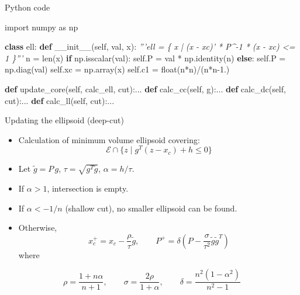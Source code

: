 \documentclass[10pt,ignorenonframetext,serif,onlymath]{beamer}
\newenvironment{Shaded}{}{}
\newcommand{\BuiltInTok}[1]{#1}
\newcommand{\CommentTok}[1]{\textcolor[rgb]{0.38,0.63,0.69}{\textit{#1}}}
\newcommand{\ControlFlowTok}[1]{\textcolor[rgb]{0.00,0.44,0.13}{\textbf{#1}}}
\newcommand{\FloatTok}[1]{\textcolor[rgb]{0.25,0.63,0.44}{#1}}
\newcommand{\FunctionTok}[1]{\textcolor[rgb]{0.02,0.16,0.49}{#1}}
\newcommand{\ImportTok}[1]{#1}
\newcommand{\KeywordTok}[1]{\textcolor[rgb]{0.00,0.44,0.13}{\textbf{#1}}}
\newcommand{\NormalTok}[1]{#1}
\newcommand{\OperatorTok}[1]{\textcolor[rgb]{0.40,0.40,0.40}{#1}}
\newcommand{\VariableTok}[1]{\textcolor[rgb]{0.10,0.09,0.49}{#1}}
\providecommand{\tightlist}{%
  \setlength{\itemsep}{0pt}\setlength{\parskip}{0pt}}
\begin{document}
\begin{frame}[fragile]{Python code}
\protect\hypertarget{sec:python-code-3}{}

\begin{Shaded}
\begin{Highlighting}[]
\ImportTok{import}\NormalTok{ numpy }\ImportTok{as}\NormalTok{ np}

\KeywordTok{class}\NormalTok{ ell:}
    \KeywordTok{def} \FunctionTok{__init__}\NormalTok{(}\VariableTok{self}\NormalTok{, val, x):}
        \CommentTok{'''ell = \{ x | (x - xc)' * P^-1 * (x - xc) <= 1 \}'''}
\NormalTok{        n }\OperatorTok{=} \BuiltInTok{len}\NormalTok{(x)}
        \ControlFlowTok{if}\NormalTok{ np.isscalar(val):}
            \VariableTok{self}\NormalTok{.P }\OperatorTok{=}\NormalTok{ val }\OperatorTok{*}\NormalTok{ np.identity(n)}
        \ControlFlowTok{else}\NormalTok{:}
            \VariableTok{self}\NormalTok{.P }\OperatorTok{=}\NormalTok{ np.diag(val)}
        \VariableTok{self}\NormalTok{.xc }\OperatorTok{=}\NormalTok{ np.array(x)}
        \VariableTok{self}\NormalTok{.c1 }\OperatorTok{=} \BuiltInTok{float}\NormalTok{(n}\OperatorTok{*}\NormalTok{n)}\OperatorTok{/}\NormalTok{(n}\OperatorTok{*}\NormalTok{n}\FloatTok{-1.}\NormalTok{)}

    \KeywordTok{def}\NormalTok{ update_core(}\VariableTok{self}\NormalTok{, calc_ell, cut):...}
    \KeywordTok{def}\NormalTok{ calc_cc(}\VariableTok{self}\NormalTok{, g):...}
    \KeywordTok{def}\NormalTok{ calc_dc(}\VariableTok{self}\NormalTok{, cut):...}
    \KeywordTok{def}\NormalTok{ calc_ll(}\VariableTok{self}\NormalTok{, cut):...}
\end{Highlighting}
\end{Shaded}

\end{frame}

\begin{frame}{Updating the ellipsoid (deep-cut)}
\protect\hypertarget{sec:updating-the-ellipsoid-deep-cut}{}

\begin{itemize}
\tightlist
\item
  Calculation of minimum volume ellipsoid covering:
  \[\mathcal{E} \cap \{z \mid g^T (z - x_c) + h \leq 0 \}\]
\item
  Let \(\tilde{g} = P\,g\), \(\tau = \sqrt{g^T\tilde{g}}\),
  \(\alpha = h/\tau\).
\item
  If \(\alpha > 1\), intersection is empty.
\item
  If \(\alpha < -1/n\) (shallow cut), no smaller ellipsoid can be found.
\item
  Otherwise, \[x_c^+ = x_c - \frac{\rho}{\tau} \tilde{g}, \qquad
  P^+ = \delta\left(P - \frac{\sigma}{\tau^2} \tilde{g}\tilde{g}^T\right)
   \] where
\end{itemize}

\[\rho = \frac{1+n\alpha}{n+1}, \qquad
  \sigma = \frac{2\rho}{1+\alpha}, \qquad
  \delta = \frac{n^2(1-\alpha^2)}{n^2 - 1} \]

\end{frame}
\end{document}
